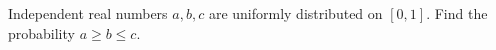 Independent real numbers $ a,b,c $ are uniformly distributed on $[0,1]$. Find the probability $ a\ge b\le c $.
